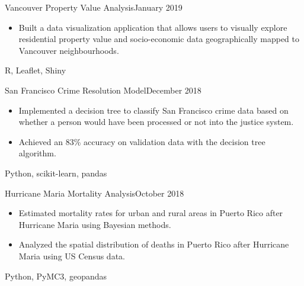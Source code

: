 %
%
%


\begin{projects}

    \project
    {Vancouver Property Value Analysis}{January 2019}
    {}
    {\begin{itemize}
    \item Built a data visualization application that allows users to visually explore residential property value and socio-economic data geographically mapped to Vancouver neighbourhoods.
    \end{itemize}}
    {R, Leaflet, Shiny}

    \project
    {\newline San Francisco Crime Resolution Model}{December 2018}
    {}
    {\begin{itemize}
    \item Implemented a decision tree to classify San Francisco crime data based on whether a person would have been processed or not into the justice system.
    \item Achieved an 83\% accuracy on validation data with the decision tree algorithm.
    \end{itemize}}
    {Python, scikit-learn, pandas}

    \project
    {\newline Hurricane Maria Mortality Analysis}{October 2018}
    {}
    {\begin{itemize}
    \item Estimated mortality rates for urban and rural areas in Puerto Rico after Hurricane Maria using Bayesian methods.
    \item Analyzed the spatial distribution of deaths in Puerto Rico after Hurricane Maria using US Census data.
    \end{itemize}}
    {Python, PyMC3, geopandas}

\end{projects}